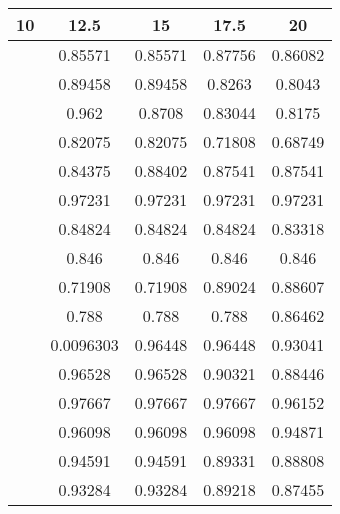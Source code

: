 \begin{tabular}{|c|c|c|c|c|}
\hline 
10 & 12.5 & 15 & 17.5 & 20 \\ 
\hline 
 & 0.85571 & 0.85571 & 0.87756 & 0.86082 \\ 
 & 0.89458 & 0.89458 & 0.8263 & 0.8043 \\ 
 & 0.962 & 0.8708 & 0.83044 & 0.8175 \\ 
 & 0.82075 & 0.82075 & 0.71808 & 0.68749 \\ 
 & 0.84375 & 0.88402 & 0.87541 & 0.87541 \\ 
 & 0.97231 & 0.97231 & 0.97231 & 0.97231 \\ 
 & 0.84824 & 0.84824 & 0.84824 & 0.83318 \\ 
 & 0.846 & 0.846 & 0.846 & 0.846 \\ 
 & 0.71908 & 0.71908 & 0.89024 & 0.88607 \\ 
 & 0.788 & 0.788 & 0.788 & 0.86462 \\ 
 & 0.0096303 & 0.96448 & 0.96448 & 0.93041 \\ 
 & 0.96528 & 0.96528 & 0.90321 & 0.88446 \\ 
 & 0.97667 & 0.97667 & 0.97667 & 0.96152 \\ 
 & 0.96098 & 0.96098 & 0.96098 & 0.94871 \\ 
 & 0.94591 & 0.94591 & 0.89331 & 0.88808 \\ 
 & 0.93284 & 0.93284 & 0.89218 & 0.87455 \\ 
\hline 
\end{tabular}
